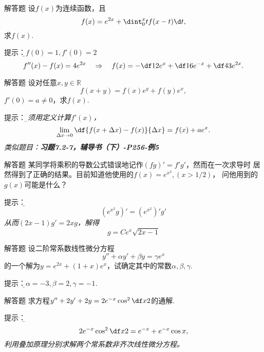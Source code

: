 \begin{frame}{解答题}
	\linespread{1.2}
	\;设$f(x)$为连续函数，且
	$$f(x)=e^{2x}+\dint_0^xtf(x-t)\d t,$$
	求$f(x)$.
	
	\pause\alert{提示：}\it\b $f(0)=1,f'(0)=2$\pause  
	$$f''(x)-f(x)=4e^{2x}\quad\Rightarrow\quad 
	f(x)=-\df12e^x+\df16e^{-x}+\df43e^{2x}.$$
\end{frame}

% 	

\begin{frame}{解答题}
	\linespread{1.2}
	\;设对任意$x,y\in\mathbb{R}$
	$$f(x+y)=f(x)e^y+f(y)e^x,$$
	$f'(0)=a\ne 0$，求$f(x)$.
	
	\pause\alert{提示：}\it\b 必须用定义计算$f'(x)$，
	$$\lim\limits_{\Delta x\to 0}\df{f(x+\Delta x)-f(x)}{\Delta x}
	=f(x)+ae^x.$$
	\pause 类似题目：\alert{\bf 习题7.2-7，辅导书（下）-P256-例5}
\end{frame}

\begin{frame}{解答题}
	\linespread{1.2}
	\;某同学将乘积的导数公式错误地记作$(fg)'=f'g'$，然而在一次求导时
	居然得到了正确的结果。目前知道他使用的$f(x)=e^{x^2},(x>1/2)$，
	问他用到的$g(x)$可能是什么？
	
	\pause\alert{提示：}\it\b  
	$$\left(e^{x^2}g\right)'=\left(e^{x^2}\right)'g'$$
	从而$(2x-1)g'=2xg$，解得
	$$g=Ce^x\sqrt{2x-1}$$
\end{frame}

\begin{frame}{解答题}
	\linespread{1.5}
	\;设二阶常系数线性微分方程
	$$y''+\alpha y'+\beta y=\gamma e^x$$
	的一个解为$y=e^{2x}+(1+x)e^x$，试确定其中的常数$\alpha,\beta,\gamma$.
	
	\pause\alert{提示：}\it\b $\alpha=-3,\beta=2,\gamma=-1$.
\end{frame}

\begin{frame}{解答题}
	\linespread{1.2}
	\;求方程$y''+2y'+2y=2e^{-x}\cos^2\df x2$的通解.
	
	\pause\alert{提示：}\it\b 
	$$2e^{-x}\cos^2\df x2=e^{-x}+e^{-x}\cos x,$$
	利用叠加原理分别求解两个常系数非齐次线性微分方程。
\end{frame}

